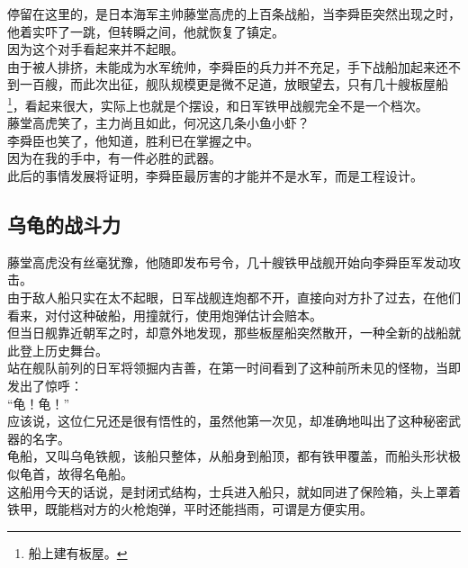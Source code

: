 \begin{multicols}{\theparacolNo}
停留在这里的，是日本海军主帅藤堂高虎的上百条战船，当李舜臣突然出现之时，他着实吓了一跳，但转瞬之间，他就恢复了镇定。\\

因为这个对手看起来并不起眼。\\

由于被人排挤，未能成为水军统帅，李舜臣的兵力并不充足，手下战船加起来还不到一百艘，而此次出征，舰队规模更是微不足道，放眼望去，只有几十艘板屋船\footnote{船上建有板屋。}，看起来很大，实际上也就是个摆设，和日军铁甲战舰完全不是一个档次。\\

藤堂高虎笑了，主力尚且如此，何况这几条小鱼小虾？\\

李舜臣也笑了，他知道，胜利已在掌握之中。\\

因为在我的手中，有一件必胜的武器。\\

此后的事情发展将证明，李舜臣最厉害的才能并不是水军，而是工程设计。\\

\subsection{乌龟的战斗力}
藤堂高虎没有丝毫犹豫，他随即发布号令，几十艘铁甲战舰开始向李舜臣军发动攻击。\\

由于敌人船只实在太不起眼，日军战舰连炮都不开，直接向对方扑了过去，在他们看来，对付这种破船，用撞就行，使用炮弹估计会赔本。\\

但当日舰靠近朝军之时，却意外地发现，那些板屋船突然散开，一种全新的战船就此登上历史舞台。\\

站在舰队前列的日军将领掘内吉善，在第一时间看到了这种前所未见的怪物，当即发出了惊呼：\\

“龟！龟！”\\

应该说，这位仁兄还是很有悟性的，虽然他第一次见，却准确地叫出了这种秘密武器的名字。\\

龟船，又叫乌龟铁舰，该船只整体，从船身到船顶，都有铁甲覆盖，而船头形状极似龟首，故得名龟船。\\

这船用今天的话说，是封闭式结构，士兵进入船只，就如同进了保险箱，头上罩着铁甲，既能档对方的火枪炮弹，平时还能挡雨，可谓是方便实用。\\


\end{multicols}
